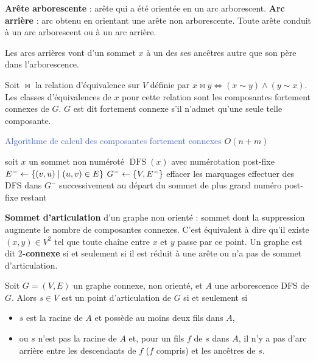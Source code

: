 \documentclass[a4paper,11pt,twocolumn]{article}
\DeclareMathOperator{\DFS}{DFS}
\begin{document}
	\begin{defn}
	\textbf{Arête arborescente} : arête qui a été orientée en un arc arborescent.
	\textbf{Arc arrière} : arc obtenu en orientant une arête non arborescente.
	Toute arête conduit à un arc arborescent ou à un arc arrière.
	\end{defn}

	\begin{lem}
	Les arcs arrières vont d'un sommet $x$ à un des ses ancêtres autre que son père dans l'arborescence.
	\end{lem}

	\begin{defn}
	Soit $\Join$ la relation d'équivalence sur $V$ définie par $x \Join y \iff (x \sim y) \wedge (y \sim x)$.
	Les classes d'équivalences de $x$ pour cette relation sont les composantes fortement connexes de $G$.
	$G$ est dit fortement connexe s'il n'admet qu'une seule telle composante.
	\end{defn}

	\begin{algorithm}
	\caption{\textcolor{RoyalBlue}{Algorithme de calcul des composantes fortement connexes} $O(n + m)$}
	{
		soit $x$ un sommet non numéroté \;
		$\DFS(x)$ avec numérotation post-fixe \;
	}
	$E^- \leftarrow \{ (v,u) \mid (u,v) \in E \}$ \;
	$G^- \leftarrow \{ V,E^- \}$ \;
	effacer les marquages \;
	effectuer des DFS dans $G^-$ successivement au départ du sommet de plus grand numéro post-fixe restant
	\end{algorithm}

	\begin{defn}
	\textbf{Sommet d'articulation} d'un graphe non orienté : sommet dont la suppression augmente le nombre de composantes connexes.
	C'est équivalent à dire qu'il existe $(x,y) \in V^2$ tel que toute chaîne entre $x$ et $y$ passe par ce point.
	Un graphe est dit \textbf{$2$-connexe} si et seulement si il est réduit à une arête ou n'a pas de sommet d'articulation.
	\end{defn}

	\begin{thm}
	Soit $G = (V,E)$ un graphe connexe, non orienté, et $A$ une arborescence DFS de $G$.
	Alors $s \in V$ est un point d'articulation de $G$ si et seulement si
		\begin{itemize}
		\item $s$ est la racine de $A$ et possède au moins deux fils dans $A$,
		\item ou $s$ n'est pas la racine de $A$ et, pour un fils $f$ de $s$ dans $A$, il n'y a pas d'arc arrière entre les descendants de $f$ ($f$ compris) et les ancêtres de $s$.
		\end{itemize}
	\end{thm}
\end{document}
